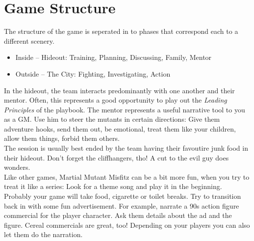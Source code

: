 \documentclass{book}
\begin{document}
\section*{Game Structure}
The structure of the game is seperated in to phases that correspond each to a different scenery.
\begin{itemize}
    \item Inside -- Hideout: Training, Planning, Discussing, Family, Mentor
    \item Outside -- The City: Fighting, Investigating, Action
\end{itemize}
In the hideout, the team interacts predominantly with one another and their mentor. Often, this represents a good opportunity to play out the \emph{Leading Principles} of the playbook. The mentor represents a useful narrative tool to you as a GM. Use him to steer the mutants in certain directions: Give them adventure hooks, send them out, be emotional, treat them like your children, allow them things, forbid them others.\\
\medskip
The session is usually best ended by the team having their favoutire junk food in their hideout. Don't forget the cliffhangers, tho! A cut to the evil guy does wonders.\\
\medskip
Like other games, Martial Mutant Misfitz can be a bit more fun, when you try to treat it like a series: Look for a theme song and play it in the beginning. Probably your game will take food, cigarette or toilet breaks. Try to transition back in with some fun advertisement. For example, narrate a 90s action figure commercial for the player character. Ask them details about the ad and the figure. Cereal commercials are great, too! Depending on your players you can also let them do the narration.
\end{document}
